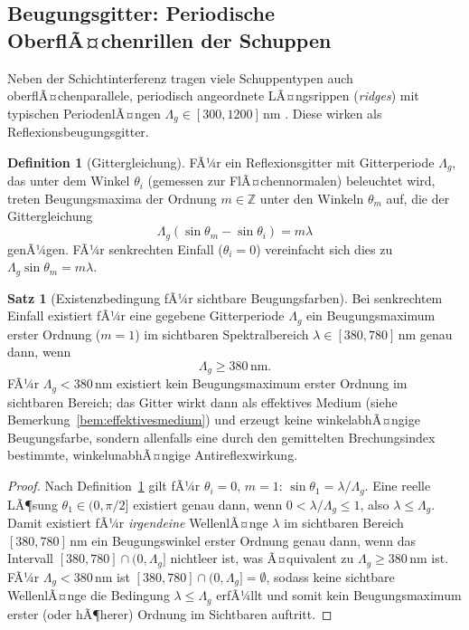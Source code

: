 ﻿\documentclass[a4paper,12pt]{article}
\theoremstyle{definition}
\newtheorem{definition}{Definition}
\newtheorem{satz}{Satz}
\begin{document}
\subsection{Beugungsgitter: Periodische OberflÃ¤chenrillen der Schuppen}
\label{sec:beugung}

Neben der Schichtinterferenz tragen viele Schuppentypen auch
oberflÃ¤chenparallele, periodisch angeordnete LÃ¤ngsrippen
(\textit{ridges}) mit typischen PeriodenlÃ¤ngen $\Lambda_g \in
[300,1200]$\,nm \cite{ghiradella1991light}. Diese wirken als
Reflexionsbeugungsgitter.

\begin{definition}[Gittergleichung]
	\label{def:gittergleichung}
	FÃ¼r ein Reflexionsgitter mit Gitterperiode $\Lambda_g$, das unter dem
	Winkel $\theta_i$ (gemessen zur FlÃ¤chennormalen) beleuchtet wird, treten
	Beugungsmaxima der Ordnung $m\in\mathbb{Z}$ unter den Winkeln
	$\theta_m$ auf, die der Gittergleichung
	\[
	\Lambda_g\left(\sin\theta_m - \sin\theta_i\right) = m\lambda
	\]
	genÃ¼gen. FÃ¼r senkrechten Einfall ($\theta_i = 0$) vereinfacht sich dies
	zu $\Lambda_g \sin\theta_m = m\lambda$.
\end{definition}

\begin{satz}[Existenzbedingung fÃ¼r sichtbare Beugungsfarben]
	\label{satz:beugungsfarben}
	Bei senkrechtem Einfall existiert fÃ¼r eine gegebene Gitterperiode
	$\Lambda_g$ ein Beugungsmaximum erster Ordnung ($m=1$) im sichtbaren
	Spektralbereich $\lambda \in [380,780]$\,nm genau dann, wenn
	\[
	\Lambda_g \ge 380\,\text{nm}.
	\]
	FÃ¼r $\Lambda_g < 380$\,nm existiert kein Beugungsmaximum erster Ordnung
	im sichtbaren Bereich; das Gitter wirkt dann als effektives Medium
	(siehe Bemerkung~\ref{bem:effektivesmedium}) und erzeugt keine
	winkelabhÃ¤ngige Beugungsfarbe, sondern allenfalls eine durch den
	gemittelten Brechungsindex bestimmte, winkelunabhÃ¤ngige Antireflexwirkung.
\end{satz}

\begin{proof}
	Nach Definition~\ref{def:gittergleichung} gilt fÃ¼r $\theta_i=0$,
	$m=1$: $\sin\theta_1 = \lambda/\Lambda_g$. Eine reelle LÃ¶sung
	$\theta_1\in(0,\pi/2]$ existiert genau dann, wenn
	$0 < \lambda/\Lambda_g \le 1$, also $\lambda \le \Lambda_g$. Damit
	existiert fÃ¼r \emph{irgendeine} WellenlÃ¤nge $\lambda$ im sichtbaren
	Bereich $[380,780]$\,nm ein Beugungswinkel erster Ordnung genau dann,
	wenn das Intervall $[380,780]\cap(0,\Lambda_g]$ nichtleer ist, was
	Ã¤quivalent zu $\Lambda_g \ge 380$\,nm ist. FÃ¼r $\Lambda_g<380$\,nm ist
	$[380,780]\cap(0,\Lambda_g] = \emptyset$, sodass keine sichtbare
	WellenlÃ¤nge die Bedingung $\lambda\le\Lambda_g$ erfÃ¼llt und somit kein
	Beugungsmaximum erster (oder hÃ¶herer) Ordnung im Sichtbaren auftritt.
\end{proof}
\end{document}
